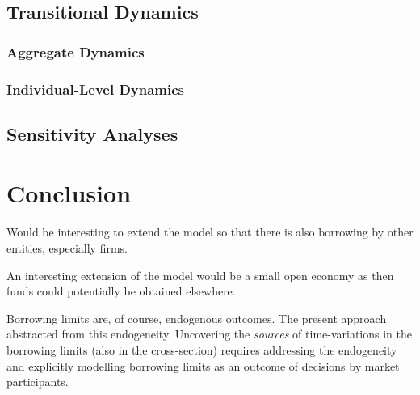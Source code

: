 \documentclass[12pt]{article} %
\numberwithin{equation}{section} %
\begin{document}
\subsection{Transitional Dynamics}
\label{sec:results-transition}

\subsubsection{Aggregate Dynamics}
\label{sec:results-transition-agg}

\subsubsection{Individual-Level Dynamics}
\label{sec:results-transition-ind}

\subsection{Sensitivity Analyses}
\label{sec:results-sensitivity}

\section{Conclusion}
\label{sec:conclusion}

Would be interesting to extend the model so  that there is also borrowing by other entities, especially firms.

An interesting extension of the model would be a small open economy as then funds could potentially be obtained elsewhere.

Borrowing limits are, of course, endogenous outcomes. The present approach abstracted from this endogeneity. Uncovering the \textit{sources} of time-variations in the borrowing limits (also in the cross-section) requires addressing the endogeneity and explicitly modelling borrowing limits as an outcome of decisions by market participants.

\newpage
\thispagestyle{plain}
\printbibliography[heading=bibintoc] %
\end{document}
